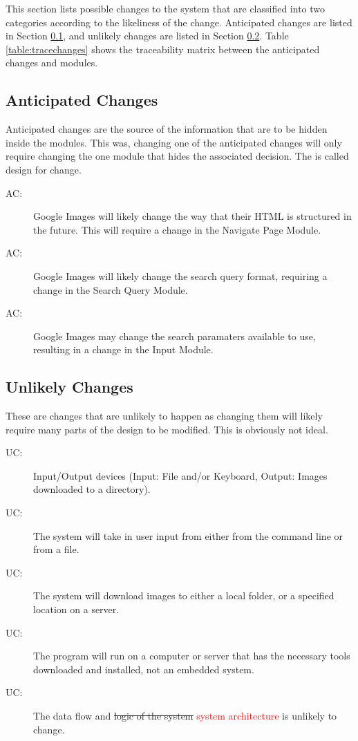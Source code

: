 \documentclass[12pt, titlepage]{article}
\newcounter{acnum}
\newcommand{\actheacnum}{AC\theacnum}
\newcounter{ucnum}
\newcommand{\uctheucnum}{UC\theucnum}
\begin{document}
This section lists possible changes to the system that are classified into two
categories according to the likeliness of the change. Anticipated changes are 
listed in Section \ref{SecAchange}, and unlikely changes are listed in Section \ref{SecUchange}.
Table \ref{table:tracechanges} shows the traceability matrix between the anticipated changes and modules.

\subsection{Anticipated Changes} \label{SecAchange}

Anticipated changes are the source of the information that are to be hidden
inside the modules. This was, changing one of the anticipated changes will only
require changing the one module that hides the associated decision. The is called design for change.

\begin{description}
\item[ \actheacnum \label{acHTMLStructure}:] Google Images will likely change the way that their HTML is structured in the future.
This will require a change in the Navigate Page Module.
\item[ \actheacnum \label{acQueryFormat}:] Google Images will likely change the search query format, requiring a change 
in the Search Query Module.
\item[ \actheacnum \label{acInputParam}:] Google Images may change the search paramaters available to use, resulting 
in a change in the Input Module.
\end{description}

\subsection{Unlikely Changes} \label{SecUchange}

These are changes that are unlikely to happen as changing them will likely require many parts of the design to 
be modified. This is obviously not ideal.

\begin{description}
\item[ \uctheucnum \label{ucIO}:] Input/Output devices
  (Input: File and/or Keyboard, Output: Images downloaded to a directory).
\item[ \uctheucnum \label{ucInput}:] The system will take in user input from either from the command line or from a file.
\item[ \uctheucnum \label{ucOutput}:] The system will download images to either a local folder, or a specified
location on a server.
\item[ \uctheucnum \label{ucOutput}:] The program will run on a computer or server that has the necessary tools 
downloaded and installed, not an embedded system.
\item[ \uctheucnum \label{ucFlow}:] The data flow and \st{logic of the system} \textcolor{red}{system architecture} is unlikely to change.
\end{description}
\end{document}

